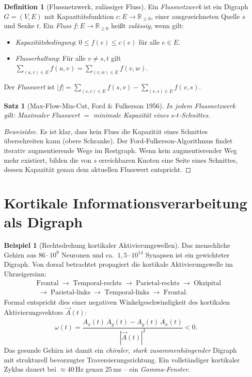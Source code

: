 ﻿\documentclass[a4paper,12pt,openany,oneside]{book}
\theoremstyle{definition}
\newtheorem{definition}{Definition}[chapter]
\newtheorem{beispiel}{Beispiel}[chapter]
\theoremstyle{plain}
\newtheorem{satz}{Satz}[chapter]
\theoremstyle{remark}
\begin{document}
\begin{definition}[Flussnetzwerk, zul\"assiger Fluss]
  Ein \emph{Flussnetzwerk} ist ein Digraph $G = (V,E)$ mit
  Kapazit\"atsfunktion $c: E \to \mathbb{R}_{\geq 0}$, einer
  ausgezeichneten Quelle $s$ und Senke $t$. Ein \emph{Fluss}
  $f: E \to \mathbb{R}_{\geq 0}$ hei\ss{}t \emph{zul\"assig}, wenn gilt:
  \begin{itemize}
    \item \emph{Kapazit\"atsbedingung}: $0 \leq f(e) \leq c(e)$
          f\"ur alle $e \in E$.
    \item \emph{Flusserhaltung}: F\"ur alle $v \neq s,t$ gilt
          $\sum_{(u,v)\in E} f(u,v) = \sum_{(v,w)\in E} f(v,w)$.
  \end{itemize}
  Der \emph{Flusswert} ist
  $|f| = \sum_{(s,v)\in E} f(s,v) - \sum_{(v,s)\in E} f(v,s)$.
\end{definition}

\begin{satz}[Max-Flow-Min-Cut, Ford \& Fulkerson 1956]
  In jedem Flussnetzwerk gilt:
  Maximaler Flusswert $=$ minimale Kapazit\"at eines $s$-$t$-Schnittes.
\end{satz}

\begin{proof}[Beweisidee]
  Es ist klar, dass kein Fluss die Kapazit\"at eines Schnittes \"uberschreiten
  kann (obere Schranke). Der Ford-Fulkerson-Algorithmus findet iterativ
  augmentierende Wege im Restgraph. Wenn kein augmentierender Weg mehr
  existiert, bilden die von $s$ erreichbaren Knoten eine Seite eines
  Schnittes, dessen Kapazit\"at genau dem aktuellen Flusswert entspricht.
\end{proof}

\section{Kortikale Informationsverarbeitung als Digraph}

\begin{beispiel}[Rechtsdrehung kortikaler Aktivierungswellen]
  Das menschliche Gehirn aus $86 \cdot 10^9$ Neuronen und ca.~$1{,}5 \cdot
  10^{14}$ Synapsen ist ein gewichteter Digraph. Von dorsal betrachtet
  propagiert die kortikale Aktivierungswelle im Uhrzeigersinn:
  \begin{align*}
    &\text{Frontal} \;\to\; \text{Temporal-rechts} \;\to\;
     \text{Parietal-rechts} \;\to\; \text{Okzipital}\\
    &\;\to\; \text{Parietal-links} \;\to\; \text{Temporal-links}
     \;\to\; \text{Frontal}.
  \end{align*}
  Formal entspricht dies einer negativen Winkelgeschwindigkeit des
  kortikalen Aktivierungsvektors $\vec{A}(t)$:
  \[
    \omega(t) = \frac{A_x(t)\,\dot{A}_y(t) - A_y(t)\,\dot{A}_x(t)}
                     {|\vec{A}(t)|^2} < 0.
  \]
  Das gesunde Gehirn ist damit ein \emph{chiraler, stark zusammenh\"angender}
  Digraph mit strukturell bevorzugter Traversierungsrichtung. Ein
  vollst\"andiger kortikaler Zyklus dauert bei $\approx 40$\,Hz genau
  $25$\,ms -- ein \emph{Gamma-Fenster}.
\end{beispiel}
\end{document}
